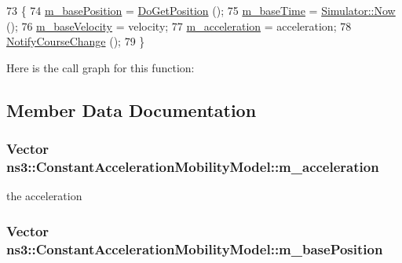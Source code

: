 \begin{DoxyCode}
73 \{
74   \hyperlink{classns3_1_1ConstantAccelerationMobilityModel_a224b67b17c174a5b54a76342193f347a}{m\_basePosition} = \hyperlink{classns3_1_1ConstantAccelerationMobilityModel_a403651b388d398b5b4798f8c647ec1c0}{DoGetPosition} ();
75   \hyperlink{classns3_1_1ConstantAccelerationMobilityModel_abae468b93d91aa5d58d1f8bd87bdd3ad}{m\_baseTime} = \hyperlink{classns3_1_1Simulator_ac3178fa975b419f7875e7105be122800}{Simulator::Now} ();
76   \hyperlink{classns3_1_1ConstantAccelerationMobilityModel_ad6271f0bacfbbf877887232c477d06f7}{m\_baseVelocity} = velocity;
77   \hyperlink{classns3_1_1ConstantAccelerationMobilityModel_a7890737c1d5ac182abfcf3316bbbefa2}{m\_acceleration} = acceleration;
78   \hyperlink{classns3_1_1MobilityModel_add1317917ac801284c2467a68f09fbe5}{NotifyCourseChange} ();
79 \}
\end{DoxyCode}


Here is the call graph for this function\+:




\subsection{Member Data Documentation}
\subsubsection[{\texorpdfstring{m\+\_\+acceleration}{m_acceleration}}]{\setlength{\rightskip}{0pt plus 5cm}Vector ns3\+::\+Constant\+Acceleration\+Mobility\+Model\+::m\+\_\+acceleration\hspace{0.3cm}{\ttfamily [private]}}\hypertarget{classns3_1_1ConstantAccelerationMobilityModel_a7890737c1d5ac182abfcf3316bbbefa2}{}\label{classns3_1_1ConstantAccelerationMobilityModel_a7890737c1d5ac182abfcf3316bbbefa2}


the acceleration 

\subsubsection[{\texorpdfstring{m\+\_\+base\+Position}{m_basePosition}}]{\setlength{\rightskip}{0pt plus 5cm}Vector ns3\+::\+Constant\+Acceleration\+Mobility\+Model\+::m\+\_\+base\+Position\hspace{0.3cm}{\ttfamily [private]}}\hypertarget{classns3_1_1ConstantAccelerationMobilityModel_a224b67b17c174a5b54a76342193f347a}{}\label{classns3_1_1ConstantAccelerationMobilityModel_a224b67b17c174a5b54a76342193f347a}


